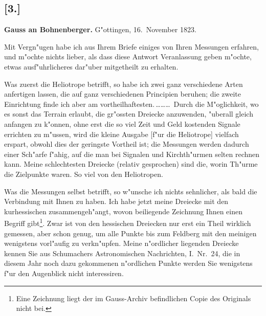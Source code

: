\documentclass[12pt,a4paper]{article}
\theoremstyle{plain}
\theoremstyle{definition}
\theoremstyle{remark}
\begin{document}
\subsection*{[3.]}

\noindent \textbf{Gauss an Bohnenberger.} G"ottingen, 16.~November 1823.

\medskip
\noindent Mit Vergn"ugen habe ich aus Ihrem Briefe einiges von Ihren Messungen erfahren, und m"ochte nichts lieber, als dass diese Antwort Veranlassung geben m"ochte, etwas ausf"uhrlicheres dar"uber mitgetheilt zu erhalten.

Was zuerst die Heliotrope betrifft, so habe ich zwei ganz verschiedene Arten anfertigen lassen, die auf ganz verschiedenen Principien beruhen; die zweite Einrichtung finde ich aber am vortheilhaftesten.\,\ldots\ldots\ldots\ Durch die M"oglichkeit, wo es sonst das Terrain erlaubt, die gr"ossten Dreiecke anzuwenden, "uberall gleich anfangen zu k"onnen, ohne erst die so viel Zeit und Geld kostenden Signale errichten zu m"ussen, wird die kleine Ausgabe [f"ur die Heliotrope] vielfach erspart, obwohl dies der geringste Vortheil ist; die Messungen werden dadurch einer Sch"arfe f"ahig, auf die man bei Signalen und Kirchth"urmen selten rechnen kann. Meine schlechtesten Dreiecke (relativ gesprochen) sind die, worin Th"urme die Zielpunkte waren. So viel von den Heliotropen.

Was die Messungen selbst betrifft, so w"unsche ich nichts sehnlicher, als bald die Verbindung mit Ihnen zu haben. Ich habe jetzt meine Dreiecke mit den kurhessischen zusammengeh"angt, wovon beiliegende Zeichnung Ihnen einen Begriff gibt\footnote{Eine Zeichnung liegt der im Gauss-Archiv befindlichen Copie des Originals nicht bei.}. Zwar ist von den hessischen Dreiecken nur erst ein Theil wirklich gemessen, aber schon genug, um alle Punkte bis zum Feldberg mit den meinigen wenigstens vorl"aufig zu verkn"upfen. Meine n"ordlicher liegenden Dreiecke kennen Sie aus Schumachers Astronomischen Nachrichten, I.\ Nr.~24, die in diesem Jahr noch dazu gekommenen n"ordlichen Punkte werden Sie wenigstens f"ur den Augenblick nicht interessiren.
\end{document}
